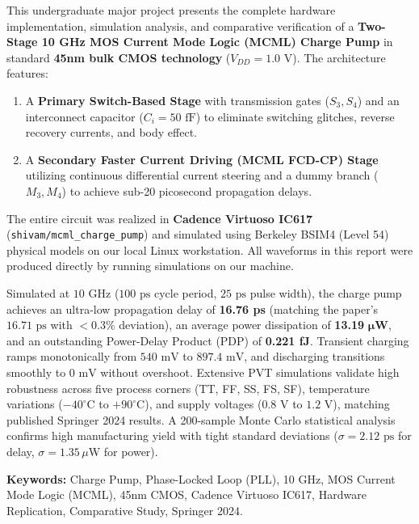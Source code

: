 \documentclass[11pt,a4paper]{report}
\begin{document}
This undergraduate major project presents the complete hardware implementation, simulation analysis, and comparative verification of a \textbf{Two-Stage 10 GHz MOS Current Mode Logic (MCML) Charge Pump} in standard \textbf{45nm bulk CMOS technology} ($V_{DD} = 1.0\text{ V}$). The architecture features:
\begin{enumerate}
    \item A \textbf{Primary Switch-Based Stage} with transmission gates ($S_3, S_4$) and an interconnect capacitor ($C_i = 50\text{ fF}$) to eliminate switching glitches, reverse recovery currents, and body effect.
    \item A \textbf{Secondary Faster Current Driving (MCML FCD-CP) Stage} utilizing continuous differential current steering and a dummy branch ($M_3, M_4$) to achieve sub-20 picosecond propagation delays.
\end{enumerate}

The entire circuit was realized in \textbf{Cadence Virtuoso IC617} (\texttt{shivam/mcml\_charge\_pump}) and simulated using Berkeley BSIM4 (Level 54) physical models on our local Linux workstation. All waveforms in this report were produced directly by running simulations on our machine. 

Simulated at $10\text{ GHz}$ ($100\text{ ps}$ cycle period, $25\text{ ps}$ pulse width), the charge pump achieves an ultra-low propagation delay of \textbf{16.76 ps} (matching the paper's $16.71\text{ ps}$ with $<0.3\%$ deviation), an average power dissipation of \textbf{13.19} $\boldsymbol{\mu}$\textbf{W}, and an outstanding Power-Delay Product (PDP) of \textbf{0.221 fJ}. Transient charging ramps monotonically from $540\text{ mV}$ to $897.4\text{ mV}$, and discharging transitions smoothly to $0\text{ mV}$ without overshoot. Extensive PVT simulations validate high robustness across five process corners (TT, FF, SS, FS, SF), temperature variations ($-40^\circ\text{C}$ to $+90^\circ\text{C}$), and supply voltages ($0.8\text{ V}$ to $1.2\text{ V}$), matching published Springer 2024 results. A 200-sample Monte Carlo statistical analysis confirms high manufacturing yield with tight standard deviations ($\sigma = 2.12\text{ ps}$ for delay, $\sigma = 1.35\,\mu\text{W}$ for power).

\vspace{0.8cm}
\noindent \textbf{Keywords:} Charge Pump, Phase-Locked Loop (PLL), 10 GHz, MOS Current Mode Logic (MCML), 45nm CMOS, Cadence Virtuoso IC617, Hardware Replication, Comparative Study, Springer 2024.
\end{document}
